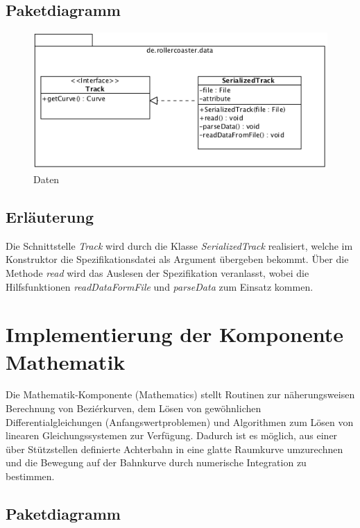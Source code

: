 \subsection{Paketdiagramm}

\begin{figure}
\includegraphics[width=\linewidth]{bilder/Data}
\caption{Daten}
\end{figure}

\subsection{Erläuterung}

Die Schnittstelle \emph{Track} wird durch die Klasse \emph{SerializedTrack} realisiert,
welche im Konstruktor die Spezifikationsdatei als Argument übergeben bekommt. Über
die Methode \emph{read} wird das Auslesen der Spezifikation veranlasst, wobei
die Hilfsfunktionen \emph{readDataFormFile} und \emph{parseData} zum Einsatz kommen.

\section{Implementierung der Komponente Mathematik}

Die Mathematik-Komponente (Mathematics) stellt Routinen zur näherungsweisen Berechnung
von Beziérkurven, dem Lösen von gewöhnlichen Differentialgleichungen 
(Anfangswertproblemen) und Algorithmen zum Lösen von linearen Gleichungssystemen
zur Verfügung. Dadurch ist es möglich, aus einer über Stützstellen definierte 
Achterbahn in eine glatte Raumkurve umzurechnen und die Bewegung auf
der Bahnkurve durch numerische Integration zu bestimmen.

\subsection{Paketdiagramm}

